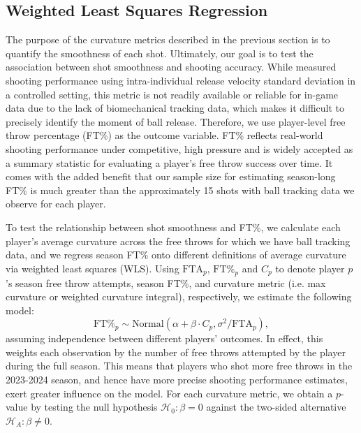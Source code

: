 \documentclass{article}
\begin{document}
    \subsection{Weighted Least Squares Regression}

      The purpose of the curvature metrics described in the previous section is to quantify the smoothness of each shot. Ultimately, our goal is to test the association between shot smoothness and shooting accuracy. While \citet{slegers_role_2024} measured shooting performance using intra-individual release velocity standard deviation in a controlled setting, this metric is not readily available or reliable for in-game data due to the lack of biomechanical tracking data, which makes it difficult to precisely identify the moment of ball release. Therefore, we use player-level free throw percentage (FT\%) as the outcome variable. FT\% reflects real-world shooting performance under competitive, high pressure and is widely accepted as a summary statistic for evaluating a player’s free throw success over time. It comes with the added benefit that our sample size for estimating season-long FT\% is much greater than the approximately 15 shots with ball tracking data we observe for each player.

      To test the relationship between shot smoothness and FT\%, we calculate each player's average curvature across the free throws for which we have ball tracking data, and we regress season FT\% onto different definitions of average curvature via weighted least squares (WLS). Using \(\mbox{FTA}_p\), \(\mbox{FT\%}_p\) and \(C_p\) to denote player $p$'s season free throw attempts, season FT\%, and curvature metric (i.e. max curvature or weighted curvature integral), respectively, we estimate the following model:
      \begin{equation}
      \label{eqn:weighted-least-squares}
        \mbox{FT\%}_p \sim \mbox{Normal}(\alpha + \beta \cdot C_p, \sigma^2 / \mbox{FTA}_p),
      \end{equation}
      assuming independence between different players' outcomes. In effect, this weights each observation by the number of free throws attempted by the player during the full season. This means that players who shot more free throws in the 2023-2024 season, and hence have more precise shooting performance estimates, exert greater influence on the model. For each curvature metric, we obtain a $p$-value by testing the null hypothesis $\mathcal{H}_0: \beta = 0$ against the two-sided alternative $\mathcal{H}_A: \beta \ne 0$.
      
\end{document}
